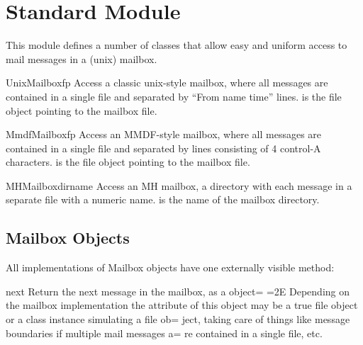 \section{Standard Module }

\renewcommand{\indexsubitem}{(in module mailbox)}

This module defines a number of classes that allow easy and uniform
access to mail messages in a (unix) mailbox.

\begin{funcdesc}{UnixMailbox}{fp}
Access a classic unix-style mailbox, where all messages are contained
in a single file and separated by ``From name time'' lines. 
is the file object pointing to the mailbox file.
\end{funcdesc}

\begin{funcdesc}{MmdfMailbox}{fp}
Access an MMDF-style mailbox, where all messages are contained
in a single file and separated by lines consisting of 4 control-A
characters. 
is the file object pointing to the mailbox file.
\end{funcdesc}

\begin{funcdesc}{MHMailbox}{dirname}
Access an MH mailbox, a directory with each message in a separate
file with a numeric name. 
is the name of the mailbox directory.
\end{funcdesc}

\subsection{Mailbox Objects}

All implementations of Mailbox objects have one externally visible
method:

\begin{funcdesc}{next}{}
Return the next message in the mailbox, as a  object=
=2E
Depending on the mailbox implementation the  attribute of this
object may be a true file object or a class instance simulating a file ob=
ject,
taking care of things like message boundaries if multiple mail messages a=
re
contained in a single file, etc.
\end{funcdesc}
